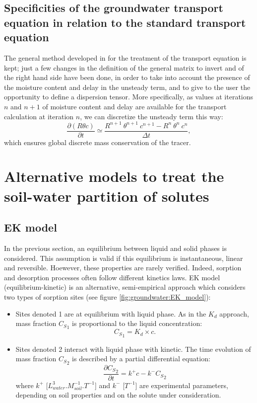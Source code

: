 \subsection{Specificities of the groundwater transport equation in relation to the standard transport equation}
The general method developed in \CS for the treatment of the transport equation is kept; just a few changes in the definition
of the general matrix to invert and of the right hand side have been done, in order to take into account the presence of the
moisture content and delay in the unsteady term,
and to give to the user the opportunity to define a dispersion tensor.
More specifically, as values at iterations $n$ and $n+1$ of moisture content and delay are available for the transport calculation at iteration $n$,
we can discretize the unsteady term this way:
\begin{equation}
\label{eq:groundwater:unsteady}
\frac{\partial(R \theta c)}{\partial{t}} \simeq \frac{R^{n+1} \ \theta^{n+1} \ c^{n+1} - R^{n} \ \theta^{n} \ c^{n}}{\Delta t},
\end{equation}
which ensures global discrete mass conservation of the tracer.

\section{Alternative models to treat the soil-water partition of solutes}

\subsection{EK model}

In the previous section, an equilibrium between liquid and solid phases is
considered. This assumption is valid if this equilibrium is instantaneous,
linear and reversible.
Hoewever, these properties are rarely verified. Indeed, sorption and desorption
processes often follow different kinetics laws.
EK model (equilibrium-kinetic) is an alternative, semi-empirical approach
which considers two types of sorption sites
(see figure \ref{fig:groundwater:EK_model}):
\begin{itemize}
\item Sites denoted 1 are at equilibrium with liquid phase. As in the $K_d$
  approach, mass fraction ${C_S}_1$ is proportional to the liquid
  concentration:
  \begin{equation}
    \label{eq:groundwater:sites_equilibrium}
    {C_S}_1 = K_d \times c.
  \end{equation}
\item Sites denoted 2 interact with liquid phase with kinetic. The time
  evolution of mass fraction ${C_S}_2$ is described by a partial differential
  equation:
  \begin{equation}
    \label{eq:groundwater:sites_kinetic}
    \frac{\partial{{C_S}_2}}{\partial{t}} = k^+ c - k^- {C_S}_2
  \end{equation}
  where $k^+$ [$L^3_{water}.M^{-1}_{soil}.T^{-1}$] and $k^-$ [$T^{-1}$] are
  experimental parameters, depending on soil properties and on the solute
  under consideration.
\end{itemize}

